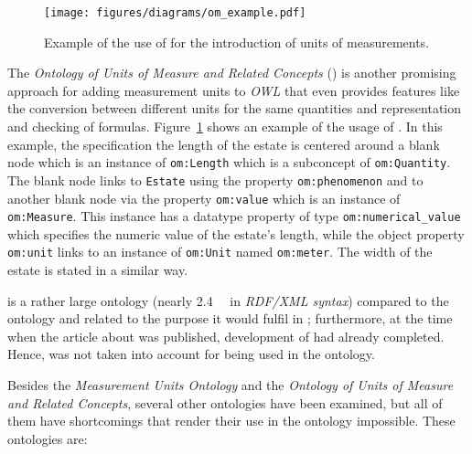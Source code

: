 \begin{figure}
\centering
\texttt{[image: figures/diagrams/om\_example.pdf]}
\caption{Example of the use of  for the introduction of units of measurements.}
\label{fig:om_example}
\end{figure}

The \emph{Ontology of Units of Measure and Related Concepts} ()\cite{OMWeb,OM} is another promising approach for adding measurement units to \emph{OWL} that even provides features like the conversion between different units for the same quantities and representation and checking of formulas. Figure~\ref{fig:om_example} shows an example of the usage of . In this example, the specification the length of the estate is centered around a blank node which is an instance of \texttt{om:Length} which is a subconcept of \texttt{om:Quantity}. The blank node links to \texttt{Estate} using the property \texttt{om:phenomenon} and to another blank node via the property \texttt{om:value} which is an instance of \texttt{om:Measure}. This instance has a datatype property of type \texttt{om:numerical\_value} which specifies the numeric value of the estate's length, while the object property \texttt{om:unit}
links to an instance of \texttt{om:Unit} named \texttt{om:meter}. The width of the estate is stated in a similar way.

 is a rather large ontology (nearly \SI{2.4}{\mebi\byte} in \emph{RDF/XML syntax}) compared to the \smarthomeweather ontology and related to the purpose it would fulfil in \smarthomeweather; furthermore, at the time when the article about  was published, development of \smarthomeweather had already completed. Hence,  was not taken into account for being used in the \smarthomeweather ontology.

Besides the \emph{Measurement Units Ontology} and the \emph{Ontology of Units of Measure and Related Concepts}, several other ontologies have been examined, but all of them have shortcomings that render their use in the \smarthomeweather ontology impossible. These ontologies are:

